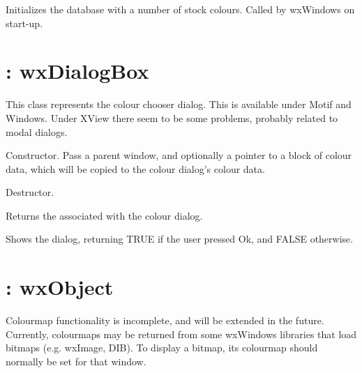 

Initializes the database with a number of stock colours.  Called by wxWindows
on start-up.

\section{: wxDialogBox}\label{wxcolourdialog}


This class represents the colour chooser dialog. This is available under
Motif and Windows. Under XView there seem to be some problems, probably
related to modal dialogs.



Constructor. Pass a parent window, and optionally a pointer to a block of colour
data, which will be copied to the colour dialog's colour data.



Destructor.



Returns the  associated with the colour dialog.



Shows the dialog, returning TRUE if the user pressed Ok, and FALSE
otherwise.

\section{: wxObject}\label{wxcolourmap}

Colourmap functionality is incomplete, and will be extended in the future.
Currently, colourmaps may be returned from some wxWindows libraries
that load bitmaps (e.g. wxImage, DIB). To display a bitmap, its colourmap
should normally be set for that window.

